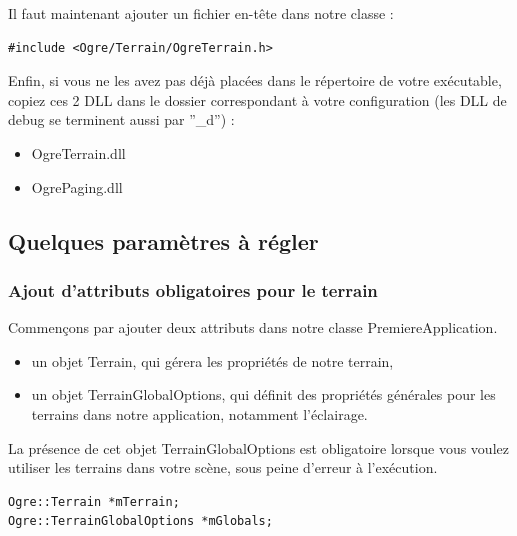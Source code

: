 \documentclass[10pt,a4paper]{report}
\begin{document}
Il faut maintenant ajouter un fichier en-t\^ete dans notre classe :

\begin{lstlisting}[caption={Ajout du fichier d'ent\^ete pour la gestion des terrains}]
#include <Ogre/Terrain/OgreTerrain.h>
\end{lstlisting}

Enfin, si vous ne les avez pas d\'ej\`a plac\'ees dans le r\'epertoire de votre ex\'ecutable, copiez ces 2 DLL dans le dossier correspondant \`a votre configuration (les DLL de debug se terminent aussi par ''\_d'') :

\begin{itemize}
\item OgreTerrain.dll
\item OgrePaging.dll
\end{itemize}




\subsection{Quelques param\`etres \`a r\'egler}

\subsubsection{Ajout d'attributs obligatoires pour le terrain}

Commen\c{c}ons par ajouter deux attributs dans notre classe PremiereApplication.

\begin{itemize}
\item un objet Terrain, qui g\'erera les propri\'et\'es de notre terrain,
\item un objet TerrainGlobalOptions, qui d\'efinit des propri\'et\'es g\'en\'erales pour les terrains dans notre application, notamment l'\'eclairage.\newline
\end{itemize}

La pr\'esence de cet objet TerrainGlobalOptions est obligatoire lorsque vous voulez utiliser les terrains dans votre sc\`ene, sous peine d'erreur \`a l'ex\'ecution.

\begin{lstlisting}[caption={Attributs pour la gestion de terrain}]
Ogre::Terrain *mTerrain;
Ogre::TerrainGlobalOptions *mGlobals;
\end{lstlisting}
\end{document}

